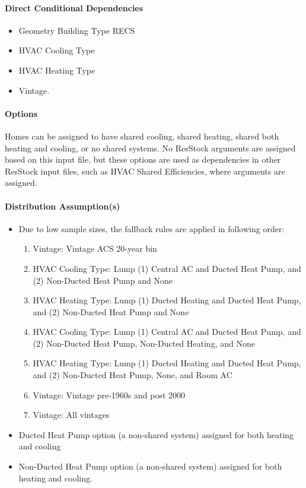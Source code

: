 \paragraph{Direct Conditional Dependencies}
\begin{itemize}
    \item Geometry Building Type RECS
    \item HVAC Cooling Type
    \item HVAC Heating Type
    \item Vintage.
\end{itemize}

\paragraph{Options}
Homes can be assigned to have shared cooling, shared heating, shared both heating and cooling, or no shared systems. No ResStock arguments are assigned based on this input file, but these options are used as dependencies in other ResStock input files, such as HVAC Shared Efficiencies, where arguments are assigned.

\paragraph{Distribution Assumption(s)}

\begin{itemize}
    \item Due to low sample sizes, the fallback rules are applied in following order:
    \begin{enumerate}
        \item Vintage: Vintage ACS 20-year bin
        \item HVAC Cooling Type: Lump (1) Central AC and Ducted Heat Pump, and (2) Non-Ducted Heat Pump and None
        \item HVAC Heating Type: Lump (1) Ducted Heating and Ducted Heat Pump, and (2) Non-Ducted Heat Pump and None
        \item HVAC Cooling Type: Lump (1) Central AC and Ducted Heat Pump, and (2) Non-Ducted Heat Pump, Non-Ducted Heating, and None
        \item HVAC Heating Type: Lump (1) Ducted Heating and Ducted Heat Pump, and (2) Non-Ducted Heat Pump, None, and Room AC
        \item Vintage: Vintage pre-1960s and post 2000
        \item Vintage: All vintages
    \end{enumerate}

    \item Ducted Heat Pump option (a non-shared system) assigned for both heating and cooling
    \item Non-Ducted Heat Pump option (a non-shared system) assigned for both heating and cooling.
\end{itemize}
 

